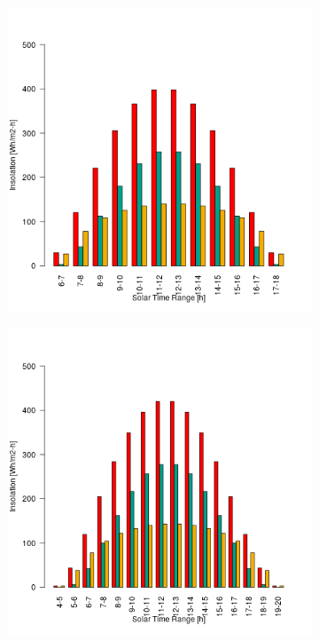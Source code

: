 \begin{figure}[H]
\begin{subfigure}[t]{\subfigureWidth}
  		\label{fig:sub:insolation-phi-m20}
  	\end{subfigure}\\[0.8ex]
    \begin{subfigure}[t]{\subfigureWidth}
      \centering
  		\includegraphics[height=\graphicsHeight]{sections/martian-environment/plots/diurnal-insolation-variation-3-for-ls-71-phi-0-and-tau-05.png}
  		\label{fig:sub:insolation-phi-0}
  	\end{subfigure}\hfill
	   \begin{subfigure}[t]{\subfigureWidth}
      \centering
  		\includegraphics[height=\graphicsHeight]{sections/martian-environment/plots/diurnal-insolation-variation-4-for-ls-71-phi-40-and-tau-05.png}

\end{subfigure}
\end{figure}
